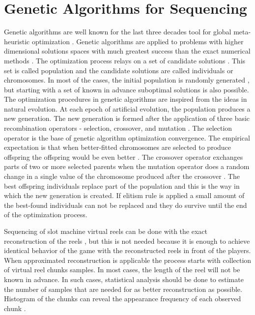 \documentclass[11pt]{article}
\begin{document}
\section{Genetic Algorithms for Sequencing}

Genetic algorithms are well known for the last three decades tool for global meta-heuristic optimization \cite{Balabanov-Ivanov-Ketipov-2020}. Genetic algorithms are applied to problems with higher dimensional solutions spaces with much greatest success than the exact numerical methods \cite{Tomov-Zankinski-Balabanov-2019}. The optimization process relays on a set of candidate solutions \cite{Balabanov-Sevova-Kolev-2019}. This set is called population and the candidate solutions are called individuals or chromosomes. In most of the cases, the initial population is randomly generated \cite{Balabanov-Barova-Keremedchiev-2016}, but starting with a set of known in advance suboptimal solutions is also possible. The optimization procedures in genetic algorithms are inspired from the ideas in natural evolution. At each epoch of artificial evolution, the population produces a new generation. The new generation is formed after the application of three basic recombination operators - selection, crossover, and mutation \cite{Balabanov-Zankinski-Barova-2016}. The selection operator is the base of genetic algorithm optimization convergence. The empirical expectation is that when better-fitted chromosomes are selected to produce offspring the offspring would be even better \cite{Balabanov-Zankinski-Dobrinkova-2011}. The crossover operator exchanges parts of two or more selected parents when the mutation operator does a random change in a single value of the chromosome produced after the crossover \cite{Balabanov-Zankinski-Shumanov-2015}. The best offspring individuals replace part of the population and this is the way in which the new generation is created. If elitism rule is applied a small amount of the best-found individuals can not be replaced and they do survive until the end of the optimization process. 

Sequencing of slot machine virtual reels can be done with the exact reconstruction of the reels \cite{Tomov-Zankinski-Balabanov-2017-2}, but this is not needed because it is enough to achieve identical behavior of the game with the reconstructed reels in front of the players. When approximated reconstruction is applicable the process starts with collection of virtual reel chunks samples. In most cases, the length of the reel will not be known in advance. In such cases, statistical analysis should be done to estimate the number of samples that are needed for as better reconstruction as possible. Histogram of the chunks can reveal the appearance frequency of each observed chunk \cite{Balabanov-2020}.
\end{document}
